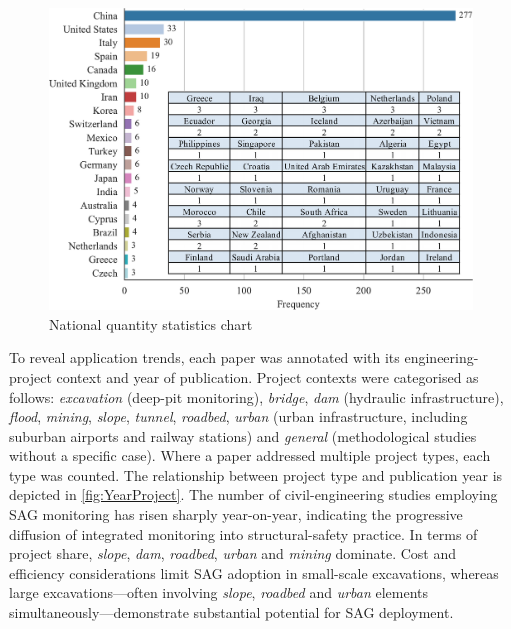 \documentclass[preprint,11pt,authoryear,3p]{elsarticle}
\begin{document}
\begin{figure}[h]
    \centering
    \includegraphics[width=\textwidth]{imgs/countries.pdf}
    \caption{National quantity statistics chart}
    \label{fig:NationalStatistcs}
\end{figure}

To reveal application trends, each paper was annotated with its engineering-project context and year of publication. Project contexts were categorised as follows: \emph{excavation} (deep-pit monitoring), \emph{bridge}, \emph{dam} (hydraulic infrastructure), \emph{flood}, \emph{mining}, \emph{slope}, \emph{tunnel}, \emph{roadbed}, \emph{urban} (urban infrastructure, including suburban airports and railway stations) and \emph{general} (methodological studies without a specific case). Where a paper addressed multiple project types, each type was counted. The relationship between project type and publication year is depicted in \autoref{fig:YearProject}. The number of civil-engineering studies employing SAG monitoring has risen sharply year-on-year, indicating the progressive diffusion of integrated monitoring into structural-safety practice. In terms of project share, \emph{slope}, \emph{dam}, \emph{roadbed}, \emph{urban} and \emph{mining} dominate. Cost and efficiency considerations limit SAG adoption in small-scale excavations, whereas large excavations—often involving \emph{slope}, \emph{roadbed} and \emph{urban} elements simultaneously—demonstrate substantial potential for SAG deployment.
\end{document}
